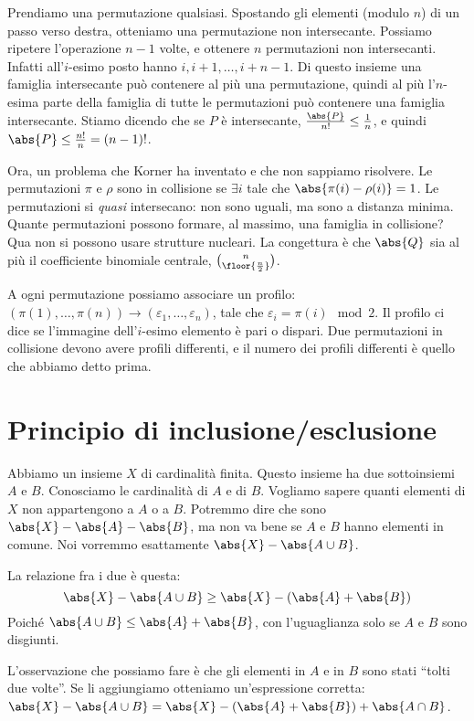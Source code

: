 Prendiamo una permutazione qualsiasi.
Spostando gli elementi (modulo $n$) di un passo verso destra, otteniamo una permutazione non intersecante.
Possiamo ripetere l'operazione $n-1$ volte, e ottenere $n$ permutazioni non intersecanti.
Infatti all'$i$-esimo posto hanno $i,i+1,\dots,i+n-1$.
Di questo insieme una famiglia intersecante pu\`o contenere al pi\`u una permutazione, quindi al pi\`u l'$n$-esima parte della famiglia di tutte le permutazioni pu\`o contenere una famiglia intersecante.
Stiamo dicendo che se $P$ \`e intersecante, $\frac{\abs{P}}{n!} \le \frac{1}{n}$, e quindi $\abs{P} \le \frac{n!}{n} = (n-1)!$.

Ora, un problema che Korner ha inventato e che non sappiamo risolvere.
Le permutazioni $\pi$ e $\rho$ sono in collisione se $\exists i$ tale che $\abs{\pi(i) - \rho(i)} = 1$.
Le permutazioni si \emph{quasi} intersecano: non sono uguali, ma sono a distanza minima.
Quante permutazioni possono formare, al massimo, una famiglia in collisione?
Qua non si possono usare strutture nucleari.
La congettura \`e che $\abs{Q}$ sia al pi\`u il coefficiente binomiale centrale, $\binom{n}{\floor{\frac{n}{2}}}$.

A ogni permutazione possiamo associare un profilo: $(\pi(1), \dots, \pi(n)) \to (\varepsilon_1, \dots, \varepsilon_n)$, tale che $\varepsilon_i = \pi(i) \mod 2$.
Il profilo ci dice se l'immagine dell'$i$-esimo elemento \`e pari o dispari.
Due permutazioni in collisione devono avere profili differenti, e il numero dei profili differenti \`e quello che abbiamo detto prima.

\section{Principio di inclusione/esclusione}

Abbiamo un insieme $X$ di cardinalit\`a finita.
Questo insieme ha due sottoinsiemi $A$ e $B$.
Conosciamo le cardinalit\`a di $A$ e di $B$.
Vogliamo sapere quanti elementi di $X$ non appartengono a $A$ o a $B$.
Potremmo dire che sono $\abs{X} - \abs{A} - \abs{B}$, ma non va bene se $A$ e $B$ hanno elementi in comune.
Noi vorremmo esattamente $\abs{X} - \abs{A \cup B}$.

La relazione fra i due \`e questa:
\[
	\abs{X} - \abs{A \cup B} \ge \abs{X} - ( \abs{A} + \abs{B} )
\]
Poich\'e $\abs{A \cup B} \le \abs{A} + \abs{B}$, con l'uguaglianza solo se $A$ e $B$ sono disgiunti.

L'osservazione che possiamo fare \`e che gli elementi in $A$ e in $B$ sono stati ``tolti due volte''.
Se li aggiungiamo otteniamo un'espressione corretta: $\abs{X} - \abs{A \cup B} = \abs{X} - (\abs{A} + \abs{B}) + \abs{A \cap B}$.

